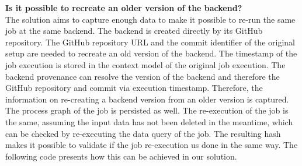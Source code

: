 \documentclass[draft,final]{vutinfth} %
\begin{document}
\textbf{Is it possible to recreate an older version of the backend?} \\
The solution aims to capture enough data to make it possible to re-run the same job at the same backend. The backend is created directly by its GitHub repository. The GitHub repository URL and the commit identifier of the original setup are needed to recreate an old version of the backend. The timestamp of the job execution is stored in the context model of the original job execution. The backend provenance can resolve the version of the backend and therefore the GitHub repository and commit via execution timestamp. Therefore, the information on re-creating a backend version from an older version is captured. The process graph of the job is persisted as well. The re-execution of the job is the same, assuming the input data has not been deleted in the meantime, which can be checked by re-executing the data query of the job. The resulting hash makes it possible to validate if the job re-execution us done in the same way. The following code presents how this can be achieved in our solution.
\end{document}
